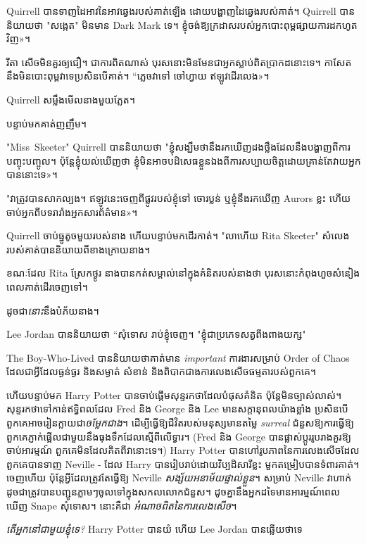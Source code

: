 {Quirrell បាន​ទាញ​ដៃអាវ​នៃ​អាវ​ឆ្វេង​របស់គាត់​ឡើង ដោយ​បង្ហាញ​ដៃឆ្វេង​របស់គាត់។ Quirrell បាននិយាយថា "សង្កេត" មិនមាន Dark Mark ទេ។ ខ្ញុំ​ចង់​ឱ្យ​ក្រដាស​របស់​អ្នក​បោះពុម្ព​ផ្សាយ​ការ​ដក​ហូត​វិញ»។

រីតា សើច​មិន​គួរ​ឲ្យ​ជឿ។ ជាការពិតណាស់ បុរសនោះមិនមែនជាអ្នកស្លាប់ពិតប្រាកដនោះទេ។ កាសែតនឹងមិនបោះពុម្ពវាទេប្រសិនបើគាត់។ “ភ្លេចវាទៅ ចៅហ្វាយ ឥឡូវ​ដើរ​លេង»។

Quirrell សម្លឹងមើលនាងមួយភ្លែត។

បន្ទាប់មកគាត់ញញឹម។

"Miss~Skeeter" Quirrell បាននិយាយថា "ខ្ញុំសង្ឃឹមថានឹងរកឃើញដងថ្លឹងដែលនឹងបង្ហាញពីការបញ្ចុះបញ្ចូល។ ប៉ុន្តែ​ខ្ញុំ​យល់​ឃើញ​ថា ខ្ញុំ​មិន​អាច​បដិសេធ​ខ្លួន​ឯង​ពី​ការ​សប្បាយ​ចិត្ត​ដោយ​គ្រាន់​តែ​វាយ​អ្នក​បាន​នោះ​ទេ»។

"វាត្រូវបានសាកល្បង។ ឥឡូវ​នេះ​ចេញ​ពី​ផ្លូវ​របស់​ខ្ញុំ​ទៅ ចោរ​ប្លន់ ឬ​ខ្ញុំ​នឹង​រក​ឃើញ Aurors ខ្លះ ហើយ​ចាប់​អ្នក​ពី​បទ​រារាំង​អ្នក​សារព័ត៌មាន»។

Quirrell ចាប់ធ្នូតូចមួយរបស់នាង ហើយបន្ទាប់មកដើរកាត់។ "លាហើយ Rita Skeeter" សំលេងរបស់គាត់បាននិយាយពីខាងក្រោយនាង។

ខណៈដែល Rita ស្រែកថ្ងូរ នាងបានកត់សម្គាល់នៅក្នុងគំនិតរបស់នាងថា បុរសនោះកំពុងហួចសំនៀងពេលគាត់ដើរចេញទៅ។

ដូចជា\emph{នោះ}នឹងបំភ័យនាង។


Lee Jordan បាននិយាយថា “សុំទោស រាប់ខ្ញុំចេញ។ "ខ្ញុំជាប្រភេទសត្វពីងពាងយក្ស"

The Boy-Who-Lived បាននិយាយថាគាត់មាន \emph{important} ការងារសម្រាប់ Order of Chaos ដែលជាអ្វីដែលធ្ងន់ធ្ងរ និងសម្ងាត់ សំខាន់ និងពិបាកជាងការលេងសើចធម្មតារបស់ពួកគេ។

ហើយបន្ទាប់មក Harry Potter បានចាប់ផ្តើមសុន្ទរកថាដែលបំផុសគំនិត ប៉ុន្តែមិនច្បាស់លាស់។ សុន្ទរកថាទៅកាន់ឥទ្ធិពលដែល Fred និង George និង Lee មានសក្តានុពលយ៉ាងខ្លាំង ប្រសិនបើពួកគេអាចរៀនក្លាយជា\emph{ចម្លែកជាង}។ ដើម្បីធ្វើឱ្យជីវិតរបស់មនុស្សមានតម្លៃ \emph{surreal} ជំនួសឱ្យការធ្វើឱ្យពួកគេភ្ញាក់ផ្អើលជាមួយនឹងធុងទឹកដែលស្មើពីលើទ្វារ។ (Fred និង George បានផ្លាស់ប្តូររូបរាងគួរឱ្យចាប់អារម្មណ៍ ពួកគេមិនដែលគិតពីវានោះទេ។) Harry Potter បានហៅរូបភាពនៃការលេងសើចដែលពួកគេបានទាញ Neville - ដែល Harry បានរៀបរាប់ដោយវិប្បដិសារីខ្លះ មួកតម្រៀបបានទំពារគាត់។ ចេញហើយ ប៉ុន្តែអ្វីដែលត្រូវតែធ្វើឱ្យ Neville \emph{សង្ស័យអនាម័យផ្ទាល់ខ្លួន}។ សម្រាប់ Neville វាហាក់ដូចជាត្រូវបានបញ្ជូនភ្លាមៗចូលទៅក្នុងសកលលោកជំនួស។ ដូច​គ្នា​នឹង​អ្នក​ដទៃ​មាន​អារម្មណ៍​ពេល​ឃើញ Snape សុំទោស។ នោះគឺជា \emph{អំណាចពិតនៃការលេងសើច}។

\emph{តើអ្នកនៅជាមួយខ្ញុំទេ?} Harry Potter បានយំ ហើយ Lee Jordan បានឆ្លើយថាទេ

}

